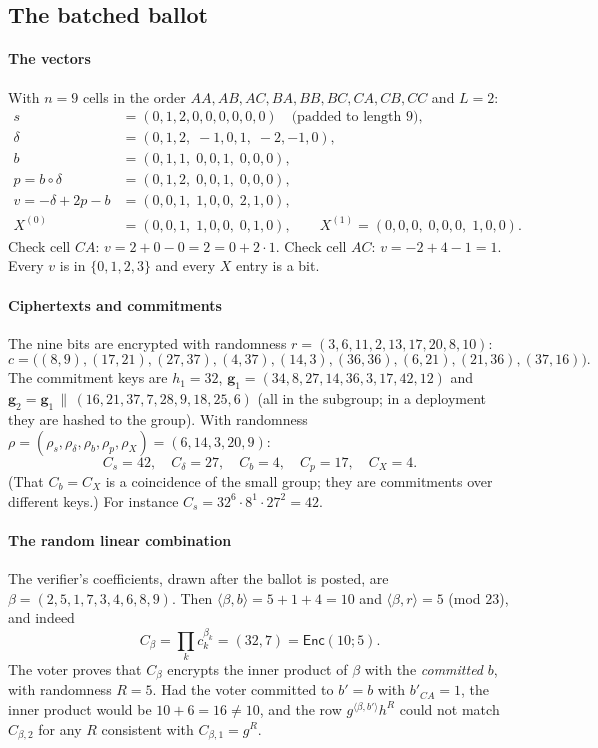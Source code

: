 \documentclass[11pt,a4paper]{article}
\newcommand{\Enc}{\mathsf{Enc}}
\theoremstyle{remark}
\begin{document}
\subsection{The batched ballot}

\paragraph{The vectors} With $n = 9$ cells in the order $AA, AB, AC, BA,
BB, BC, CA, CB, CC$ and $L = 2$:
\begin{align*}
  s &= (0, 1, 2, 0, 0, 0, 0, 0, 0) \quad\text{(padded to length $9$)}, \\
  \delta &= (0, 1, 2,\; -1, 0, 1,\; -2, -1, 0), \\
  b &= (0, 1, 1,\; 0, 0, 1,\; 0, 0, 0), \\
  p = b \circ \delta &= (0, 1, 2,\; 0, 0, 1,\; 0, 0, 0), \\
  v = -\delta + 2p - b &= (0, 0, 1,\; 1, 0, 0,\; 2, 1, 0), \\
  X^{(0)} &= (0, 0, 1,\; 1, 0, 0,\; 0, 1, 0), \qquad X^{(1)} = (0, 0, 0,\; 0, 0, 0,\; 1, 0, 0).
\end{align*}
Check cell $CA$: $v = 2 + 0 - 0 = 2 = 0 + 2 \cdot 1$. Check cell $AC$: $v
= -2 + 4 - 1 = 1$. Every $v$ is in $\{0, 1, 2, 3\}$ and every $X$ entry
is a bit.

\paragraph{Ciphertexts and commitments} The nine bits are encrypted with
randomness $r = (3, 6, 11, 2, 13, 17, 20, 8, 10)$:
\[
  c = \big((8,9), (17,21), (27,37), (4,37), (14,3), (36,36), (6,21), (21,36), (37,16)\big).
\]
The commitment keys are $h_1 = 32$, $\mathbf{g}_1 = (34, 8, 27, 14, 36,
3, 17, 42, 12)$ and $\mathbf{g}_2 = \mathbf{g}_1 \,\|\, (16, 21, 37, 7,
28, 9, 18, 25, 6)$ (all in the subgroup; in a deployment they are hashed
to the group). With randomness $\rho = (\rho_s, \rho_\delta, \rho_b,
\rho_p, \rho_X) = (6, 14, 3, 20, 9)$:
\[
  C_s = 42,\quad C_\delta = 27,\quad C_b = 4,\quad C_p = 17,\quad C_X = 4 .
\]
(That $C_b = C_X$ is a coincidence of the small group; they are
commitments over different keys.) For instance $C_s = 32^6 \cdot 8^{1}
\cdot 27^{2} = 42$.

\paragraph{The random linear combination} The verifier's coefficients,
drawn after the ballot is posted, are $\beta = (2, 5, 1, 7, 3, 4, 6, 8,
9)$. Then $\langle \beta, b \rangle = 5 + 1 + 4 = 10$ and $\langle \beta,
r \rangle = 5$ (mod $23$), and indeed
\[
  C_\beta = \prod_k c_k^{\beta_k} = (32, 7) = \Enc(10; 5).
\]
The voter proves that $C_\beta$ encrypts the inner product of $\beta$ with
the \emph{committed} $b$, with randomness $R = 5$. Had the voter committed
to $b' = b$ with $b'_{CA} = 1$, the inner product would be $10 + 6 = 16
\ne 10$, and the row $g^{\langle \beta, b' \rangle} h^{R}$ could not match
$C_{\beta, 2}$ for any $R$ consistent with $C_{\beta,1} = g^R$.
\end{document}
